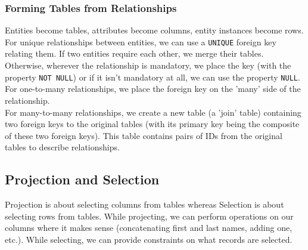 \subsubsection{Forming Tables from Relationships}

Entities become tables, attributes become columns, entity instances
become rows. 
\\[\baselineskip]
For unique relationships between entities, we
can use a \texttt{UNIQUE} foreign key relating them. 
If two entities require each other, we merge their tables. 
Otherwise, wherever the relationship is mandatory, we place the key
(with the property \texttt{NOT NULL}) or if it isn't mandatory at all,
we can use the property \texttt{NULL}.
\\[\baselineskip]
For one-to-many relationships, we place the foreign key on the
'many' side of the relationship.
\\[\baselineskip]
For many-to-many relationships, we create a new table (a 'join' table)
containing two foreign keys to the original tables (with its 
primary key being the composite of these two foreign keys).
This table contains pairs of IDs from the original tables to 
describe relationships.

\subsection{Projection and Selection}

Projection is about selecting columns from tables whereas 
Selection is about selecting rows from tables. While
projecting, we can perform operations on our columns where
it makes sense (concatenating first and last names, adding
one, etc.). While selecting, we can provide constraints on
what records are selected.
